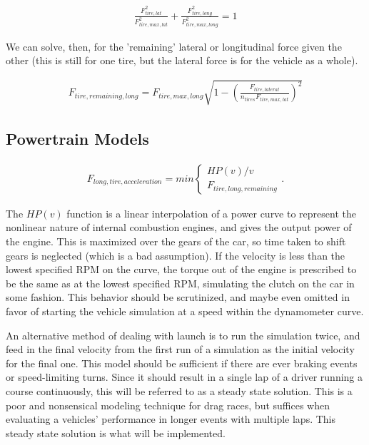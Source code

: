 \documentclass{article}
\begin{document}
\begin{align}
	\frac{F_{tire,lat}^2}{F_{tire,max,lat}^2} + \frac{F_{tire,long}^2}{F_{tire,max,long}^2} = 1
\end{align}

We can solve, then, for the 'remaining' lateral or longitudinal force given the other (this is still for one tire, but the lateral force is for the vehicle as a whole).

\begin{align}
	F_{tire,remaining,long} = F_{tire,max,long} \sqrt{1-(\frac{F_{tire,lateral}}{n_{tires} F_{tire,max,lat}})^2} 
\end{align}

\subsection{Powertrain Models}

\begin{align}
    F_{long,tire,acceleration} = min
    \begin{cases}
        HP(v)/v \\
        F_{tire,long,remaining}
    \end{cases}.\label{eq_accel_engine}
\end{align}

The $HP(v)$ function is a linear interpolation of a power curve to represent the nonlinear nature of internal combustion engines, and gives the output power of the engine. This is maximized over the gears of the car, so time taken to shift gears is neglected (which is a bad assumption). If the velocity is less than the lowest specified RPM on the curve, the torque out of the engine is prescribed to be the same as at the lowest specified RPM, simulating the clutch on the car in some fashion. This behavior should be scrutinized, and maybe even omitted in favor of starting the vehicle simulation at a speed within the dynamometer curve.

An alternative method of dealing with launch is to run the simulation twice, and feed in the final velocity from the first run of a simulation as the initial velocity for the final one. This model should be sufficient if there are ever braking events or speed-limiting turns. Since it should result in a single lap of a driver running a course continuously, this will be referred to as a steady state solution. This is a poor and nonsensical modeling technique for drag races, but suffices when evaluating a vehicles' performance in longer events with multiple laps. This steady state solution is what will be implemented.
\end{document}
